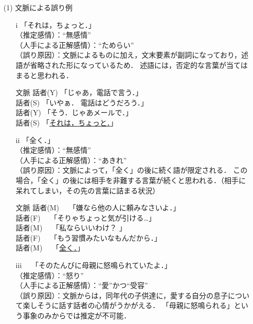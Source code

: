 \documentclass[japanese]{jnlp_1.3c}
\begin{document}
\begin{itemize}

\item [(1)] 文脈による誤り例 \\
\begin{itemize}

\item [i] 「それは，ちょっと．」\\
\hspace{0.3cm}（推定感情）：“無感情”\\
\hspace{0.3cm}（人手による正解感情）：“ためらい”\\
\hspace{0.3cm}（誤り原因）：文脈によるものに加え，文末要素が副詞になっており，述語が省略された形になっているため．
述語には，否定的な言葉が当てはまると思われる．

\begin{itembox}{文脈}
話者(Y) 「じゃあ，電話で言う．」 \\
話者(S) 「いやぁ． 電話はどうだろう．」\\
話者(Y) 「そう．じゃあメールで．」\\
話者(S) 「\underline{それは，ちょっと．}」
\end{itembox}


\item[ii] 「全く．」\\
\hspace{0.3cm}（推定感情）：“無感情”\\ 
\hspace{0.3cm}（人手による正解感情）：“あきれ”\\
\hspace{0.3cm}（誤り原因）：文脈によって，「全く」の後に続く語が限定される．
この場合，「全く」の後には相手を非難する言葉が続くと思われる．（相手に呆れてしまい，その先の言葉に詰まる状況）
\begin{itembox}{文脈}
話者(M)	\ \ 「嫌なら他の人に頼みなさいよ．」 \\
話者(F) \ \ 「そりゃちょっと気が引ける…」 \\
話者(M) \ \ 「私ならいいわけ？ 」\\
話者(F) \ \ 「もう習慣みたいなもんだから．」\\
話者(M) \ \ 「\underline{全く．}」 
\end{itembox}

\item [iii] \ \ 「そのたんびに母親に怒鳴られていたよ．」\\
\hspace{0.3cm}（推定感情）：“怒り”\\
\hspace{0.3cm}（人手による正解感情）：“愛”かつ“受容”\\
\hspace{0.3cm}（誤り原因）：文脈からは，同年代の子供達に，愛する自分の息子について楽しそうに話す話者の心情がうかがえる．
「母親に怒鳴られる」という事象のみからでは推定が不可能．


\end{itemize}
\end{itemize}
\end{document}
